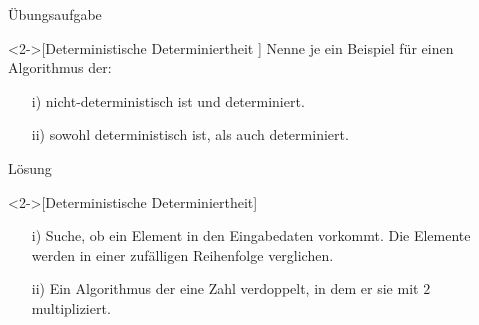 \begin{frame}[c]{Übungsaufgabe}
    \begin{exercise}<2->[Deterministische Determiniertheit ]
        \pause{}Nenne je ein Beispiel für einen Algorithmus der:
        \begin{enumerate}[<+(1)->]
            \item[i)] nicht-deterministisch ist und determiniert.
            \item[ii)] sowohl deterministisch ist, als auch determiniert.
        \end{enumerate}
    \end{exercise}
\end{frame}

\begin{frame}[c]{Lösung}
    \begin{solve}<2->[Deterministische Determiniertheit]
        \pause{}\begin{enumerate}[<+(1)->]
            \item[i)] Suche, ob ein Element in den Eingabedaten vorkommt.\pause{} Die Elemente werden in einer zufälligen Reihenfolge verglichen.
            \item[ii)] Ein Algorithmus der eine Zahl verdoppelt, in dem er sie mit \(2\) multipliziert.
        \end{enumerate}
    \end{solve}
\end{frame}
